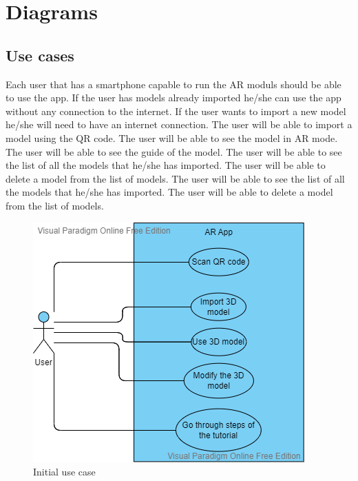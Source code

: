 \section{Diagrams}
\subsection*{Use cases}
Each user that has a smartphone capable to run the AR moduls should be able to use the app. If the user has models already imported he/she can use the app without any connection to the internet. If the user wants to import a new model he/she will need to have an internet connection. The user will be able to import a model using the QR code. The user will be able to see the model in AR mode. The user will be able to see the guide of the model. The user will be able to see the list of all the models that he/she has imported. The user will be able to delete a model from the list of models. The user will be able to see the list of all the models that he/she has imported. The user will be able to delete a model from the list of models.
\begin{figure}[h!]
    \begin{center}
        \includegraphics{img/InitialUseCase.png}
        \caption{Initial use case}
        \label{fig:InitialUseCase}
    \end{center}
\end{figure}
\pagebreak

